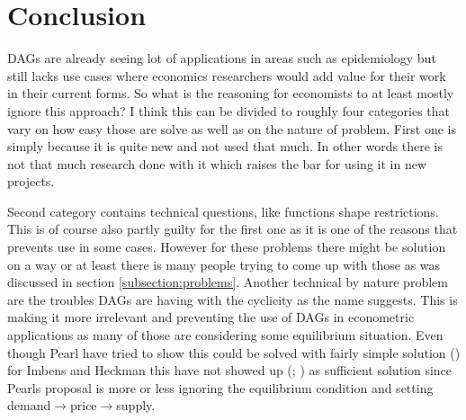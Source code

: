 \documentclass[main=english,12pt,a4paper,pdftex,econ,utf8]{aaltothesis}
\begin{document}
\clearpage

\section{Conclusion}

DAGs are already seeing lot of applications in areas such as epidemiology but still lacks use cases where economics researchers would add value for their work in their current forms. So what is the reasoning for economists to at least mostly ignore this approach? I think this can be divided to roughly four categories that vary on how easy those are solve as well as on the nature of problem. First one is simply because it is quite new and not used that much. In other words there is not that much research done with it which raises the bar for using it in new projects.

Second category contains technical questions, like functions shape restrictions. This is of course also partly guilty for the first one as it is one of the reasons that prevents use in some cases. However for these problems there might be solution on a way or at least there is many people trying to come up with those as was discussed in section \ref{subsection:problems}. Another technical by nature problem are the troubles DAGs are having with the cyclicity as the name suggests. This is making it more irrelevant and preventing the use of DAGs in econometric applications as many of those are considering some equilibrium situation. Even though Pearl have tried to show this could be solved with fairly simple solution (\cite{PearlMackenzie18}) for Imbens and Heckman this have not showed up (\cite{imbes2020}; \cite{Heckman2015}) as sufficient solution since Pearls proposal is more or less ignoring the equilibrium condition and setting demand$\rightarrow$price$\rightarrow$supply.
\end{document}

